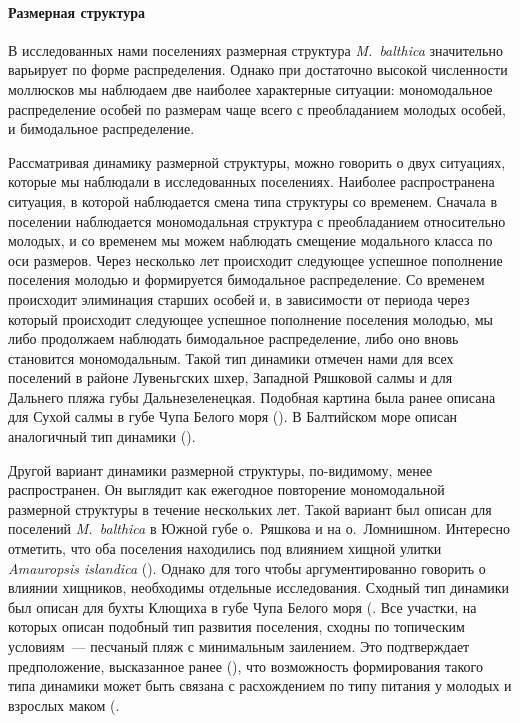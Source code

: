 {%
\paragraph{Размерная структура}
В исследованных нами поселениях размерная структура \textit{M.~balthica} значительно варьирует по форме распределения.
Однако при достаточно высокой численности моллюсков мы наблюдаем две наиболее характерные ситуации: мономодальное распределение особей по размерам чаще всего с преобладанием молодых особей, и бимодальное распределение.

Рассматривая динамику размерной структуры, можно говорить о  двух ситуациях, которые мы наблюдали в исследованных поселениях.
Наиболее распространена ситуация, в которой наблюдается смена типа структуры со временем. 
Сначала в поселении наблюдается мономодальная структура с преобладанием относительно молодых, и со временем мы можем наблюдать смещение модального класса по оси размеров. 
Через несколько лет происходит следующее успешное пополнение поселения молодью и формируется бимодальное распределение.
Со временем происходит элиминация старших особей и, в зависимости от периода через который происходит следующее успешное пополнение поселения молодью, мы либо продолжаем наблюдать бимодальное распределение, либо оно вновь становится мономодальным.
Такой тип динамики отмечен нами для всех поселений в районе Лувеньгских шхер, Западной Ряшковой салмы  и для Дальнего пляжа губы Дальнезеленецкая.
Подобная картина была ранее описана для Сухой салмы в губе Чупа Белого моря (\cite{Maximovich_et_al_1991}).
В Балтийском море описан аналогичный тип динамики (\cite{Segerstrale_1969}).

Другой вариант динамики размерной структуры, по-видимому, менее распространен.
Он выглядит как ежегодное повторение мономодальной размерной структуры в течение нескольких лет.
Такой вариант был описан для поселений \textit{M.~balthica} в Южной губе о.~Ряшкова и на о.~Ломнишном.
Интересно отметить, что оба поселения находились под влиянием хищной улитки \textit{Amauropsis islandica} (\cite{Aristov_Granovich_2011}).
Однако для того чтобы аргументированно говорить о влиянии хищников, необходимы отдельные исследования.
Сходный тип динамики был описан для бухты Клющиха в губе Чупа Белого моря (\cite{Maximovich_et_al_1991, Gerasimova_Maximovich_2013}.
Все участки, на которых описан подобный тип развития поселения, сходны по топическим условиям~--- песчаный пляж с минимальным заилением.
Это подтверждает предположение, высказанное ранее (\cite{Gerasimova_Maximovich_2013}), что возможность формирования такого типа динамики может быть связана с расхождением по типу питания у молодых и взрослых маком (\cite{Gerasimova_1988, Olafsson_1989}.


}
